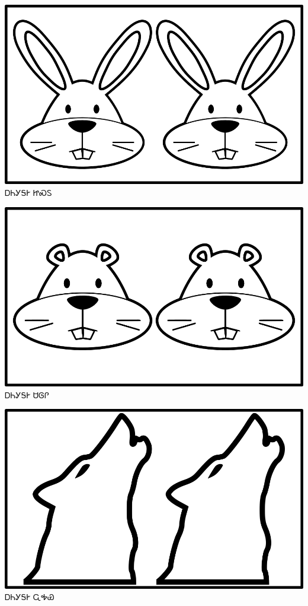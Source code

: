 \documentclass[avery5371]{flashcards}%
\begin{document}
\begin{flashcard}{
\includegraphics[width=0.95\columnwidth,height=.51\columnwidth,keepaspectratio]{../artwork/objects-animate/anitali-jisdu}
}\Huge ᎠᏂᎩᎦᎨ ᏥᏍᏚ
\end{flashcard}

\begin{flashcard}{
\includegraphics[width=0.95\columnwidth,height=.51\columnwidth,keepaspectratio]{../artwork/objects-animate/anitali-saloli}
}\Huge ᎠᏂᎩᎦᎨ ᏌᎶᎵ
\end{flashcard}

\begin{flashcard}{
\includegraphics[width=0.95\columnwidth,height=.51\columnwidth,keepaspectratio]{../artwork/objects-animate/anitali-wahya}
}\Huge ᎠᏂᎩᎦᎨ ᏩᎭᏯ
\end{flashcard}
\end{document}
